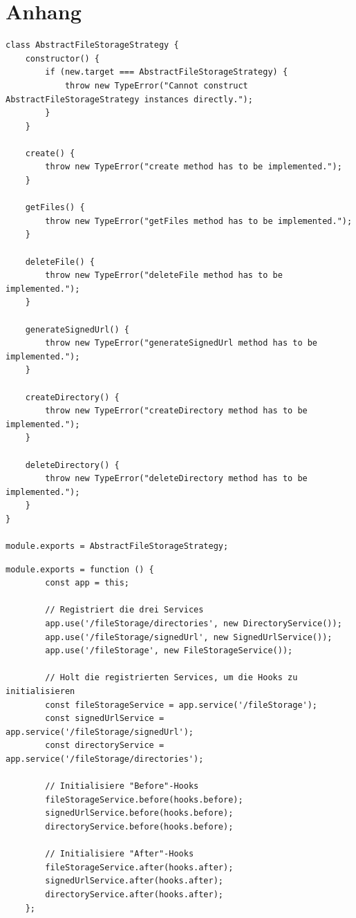 \appendix
\section{Anhang}
\label{sec:appendix}

\begin{lstlisting}[caption=Abstract file storage strategy, label=code:strategyinterface]
class AbstractFileStorageStrategy {
	constructor() {
		if (new.target === AbstractFileStorageStrategy) {
			throw new TypeError("Cannot construct AbstractFileStorageStrategy instances directly.");
		}
	}
	
	create() {
		throw new TypeError("create method has to be implemented.");
	}
	
	getFiles() {
		throw new TypeError("getFiles method has to be implemented.");
	}
	
	deleteFile() {
		throw new TypeError("deleteFile method has to be implemented.");
	}
	
	generateSignedUrl() {
		throw new TypeError("generateSignedUrl method has to be implemented.");
	}
	
	createDirectory() {
		throw new TypeError("createDirectory method has to be implemented.");
	}
	
	deleteDirectory() {
		throw new TypeError("deleteDirectory method has to be implemented.");
	}
}

module.exports = AbstractFileStorageStrategy;
\end{lstlisting}

\begin{lstlisting}[caption=Registrieren des FileStorage Services, label=code:filestorageindex]
	module.exports = function () {
		const app = this;
		
		// Registriert die drei Services
		app.use('/fileStorage/directories', new DirectoryService());
		app.use('/fileStorage/signedUrl', new SignedUrlService());
		app.use('/fileStorage', new FileStorageService());
		
		// Holt die registrierten Services, um die Hooks zu initialisieren
		const fileStorageService = app.service('/fileStorage');
		const signedUrlService = app.service('/fileStorage/signedUrl');
		const directoryService = app.service('/fileStorage/directories');
		
		// Initialisiere "Before"-Hooks
		fileStorageService.before(hooks.before);
		signedUrlService.before(hooks.before);
		directoryService.before(hooks.before);
		
		// Initialisiere "After"-Hooks
		fileStorageService.after(hooks.after);
		signedUrlService.after(hooks.after);
		directoryService.after(hooks.after);
	};
\end{lstlisting}


